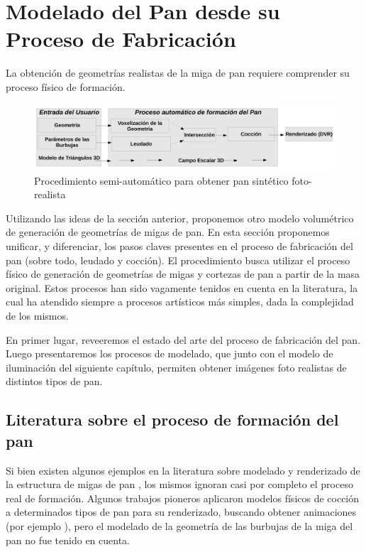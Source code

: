 \section{Modelado del Pan desde su Proceso de Fabricación}
La obtención de geometrías realistas de la miga de pan requiere comprender su proceso físico de formación.

\begin{figure}
\includegraphics[width=13cm]{figures/pipeline}
\caption{Procedimiento semi-automático para obtener pan sintético foto-realista}
\label{FigPipeline}
\end{figure}

Utilizando las ideas de la sección anterior, proponemos otro modelo volumétrico de generación de geometrías de migas de pan.
En esta sección proponemos unificar, y diferenciar, los pasos claves presentes en el proceso de fabricación del pan (sobre todo, leudado y cocción).
El procedimiento busca utilizar el proceso físico de generación de geometrías de migas y cortezas de pan a partir de la masa original.
Estos procesos han sido vagamente tenidos en cuenta en la literatura, la cual ha atendido siempre a procesos artísticos más simples, dada la complejidad de los mismos.

En primer lugar, reveeremos el estado del arte del proceso de fabricación del pan.
Luego presentaremos los procesos de modelado, que junto con el modelo de iluminación del siguiente capítulo, permiten obtener imágenes foto realistas de distintos tipos de pan.

\subsection{Literatura sobre el proceso de formación del pan}
Si bien existen algunos ejemplos en la literatura sobre modelado y renderizado de la estructura de migas de pan \cite{Tong2005,Xenakis2007}, los mismos ignoran casi por completo el proceso real de formación.
Algunos trabajos pioneros aplicaron modelos físicos de cocción a determinados tipos de pan para su renderizado, buscando obtener animaciones (por ejemplo \cite{Rodriguez-Arenas2011}), pero el modelado de la geometría de las burbujas de la miga del pan no fue tenido en cuenta.

